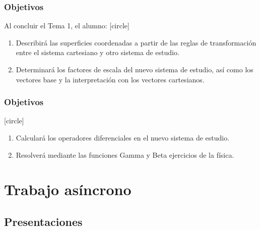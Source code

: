 \documentclass[12pt]{beamer}
\begin{document}
\begin{frame}
\frametitle{Objetivos}
Al concluir el Tema 1, el alumno:
[circle]
\begin{enumerate}[<+->]
\item Describirá las superficies coordenadas a partir de las reglas de transformación entre el sistema cartesiano y otro sistema de estudio.
\item Determinará los factores de escala del nuevo sistema de estudio, así como los vectores base y la interpretación con los vectores cartesianos.
\seti
\end{enumerate}
\end{frame}
\begin{frame}
\frametitle{Objetivos}
[circle]
\begin{enumerate}[<+->]
\conti
\item Calculará los operadores diferenciales en el nuevo sistema de estudio.
\item Resolverá mediante las funciones Gamma y Beta ejercicios de la física.
\end{enumerate}
\end{frame}

\section{Trabajo asíncrono}
\subsection{Presentaciones}
\end{document}
